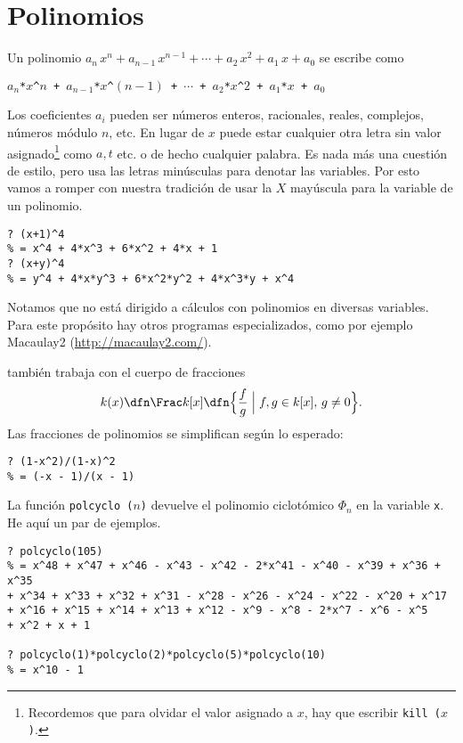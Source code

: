 
\section{Polinomios}

Un polinomio $a_n\,x^n + a_{n-1}\,x^{n-1} + \cdots + a_2\,x^2 + a_1\,x + a_0$ se
escribe como
\begin{center}
  \texttt{$a_n$*$x$\^{}$n$ + $a_{n-1}$*$x$\^{}$(n-1)$ + $\cdots$ + $a_2$*$x$\^{}$2$ + $a_1$*$x$ + $a_0$}
\end{center}
Los coeficientes $a_i$ pueden ser números enteros, racionales, reales,
complejos, números módulo $n$, etc. En lugar de $x$ puede estar cualquier otra
letra sin valor asignado\footnote{Recordemos que para olvidar el valor asignado
  a $x$, hay que escribir \texttt{kill\,($x$)}.} como $a,t$ etc. o de hecho
cualquier palabra. Es nada más una cuestión de estilo, pero \gp{} usa las letras
minúsculas para denotar las variables. Por esto vamos a romper con nuestra
tradición de usar la $X$ mayúscula para la variable de un polinomio.

\begin{framed}\footnotesize
\begin{verbatim}
? (x+1)^4
% = x^4 + 4*x^3 + 6*x^2 + 4*x + 1
? (x+y)^4
% = y^4 + 4*x*y^3 + 6*x^2*y^2 + 4*x^3*y + x^4
\end{verbatim}
\end{framed}

Notamos que \gp{} no está dirigido a cálculos con polinomios en diversas
variables. Para este propósito hay otros programas especializados, como por
ejemplo Macaulay2 (\url{http://macaulay2.com/}).

\gp{} también trabaja con el cuerpo de fracciones
$$k(x) \dfn \Frac k[x] \dfn \Bigl\{ \frac{f}{g} \Bigm| f,g\in k[x], \, g\ne 0 \Bigr\}.$$
Las fracciones de polinomios se simplifican según lo esperado:

\begin{framed}\footnotesize
\begin{verbatim}
? (1-x^2)/(1-x)^2
% = (-x - 1)/(x - 1)
\end{verbatim}
\end{framed}

La función \texttt{polcyclo\,($n$)} devuelve el polinomio ciclotómico $\Phi_n$
en la variable \texttt{x}. He aquí un par de ejemplos.

\begin{framed}\footnotesize
\begin{verbatim}
? polcyclo(105)
% = x^48 + x^47 + x^46 - x^43 - x^42 - 2*x^41 - x^40 - x^39 + x^36 + x^35
+ x^34 + x^33 + x^32 + x^31 - x^28 - x^26 - x^24 - x^22 - x^20 + x^17
+ x^16 + x^15 + x^14 + x^13 + x^12 - x^9 - x^8 - 2*x^7 - x^6 - x^5
+ x^2 + x + 1

? polcyclo(1)*polcyclo(2)*polcyclo(5)*polcyclo(10)
% = x^10 - 1
\end{verbatim}
\end{framed}

